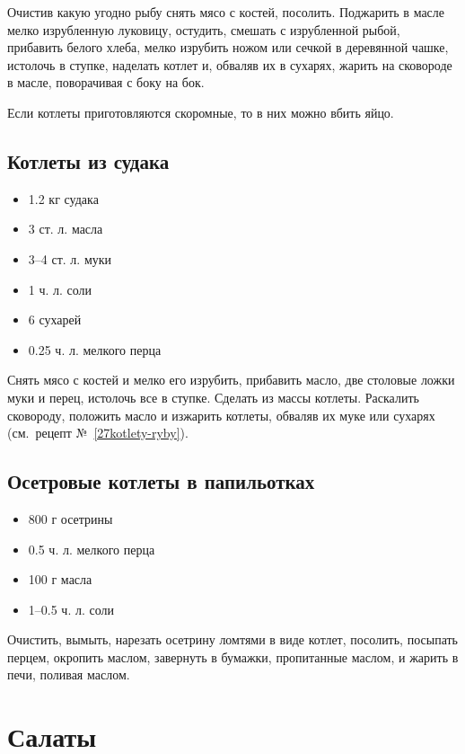 Очистив какую угодно рыбу снять мясо с костей, посолить. Поджарить в масле мелко изрубленную луковицу, остудить, смешать с изрубленной рыбой, прибавить белого хлеба, мелко изрубить ножом или сечкой в деревянной чашке, истолочь в ступке, наделать котлет и, обваляв их в сухарях, жарить на сковороде в масле, поворачивая с боку на бок.

Если котлеты приготовляются скоромные, то в них можно вбить яйцо.

\subsection{Котлеты из судака}

\begin{itemize} 
	\item  1.2 кг судака 
    \item  3 ст. л. масла 
    \item  3–4 ст. л. муки 
    \item  1 ч. л. соли 
    \item  6 сухарей 
    \item  0.25 ч. л. мелкого перца
\end{itemize}

Снять мясо с костей и мелко его изрубить, прибавить масло, две столовые ложки муки и перец, истолочь все в ступке. Сделать из массы котлеты. Раскалить сковороду, положить масло и изжарить котлеты, обваляв их муке или сухарях (см.~рецепт №~\ref{27kotlety-ryby}).

\subsection{Осетровые котлеты в папильотках}

\begin{itemize} 
	\item  800 г осетрины 
	\item  0.5 ч. л. мелкого перца 
    \item  100 г масла 
    \item  1–0.5 ч. л. соли
\end{itemize}

Очистить, вымыть, нарезать осетрину ломтями в виде котлет, посолить, посыпать перцем, окропить маслом, завернуть в бумажки, пропитанные маслом, и жарить в печи, поливая маслом.

\newpage
\section{Салаты}\label{5sec:salaty}
